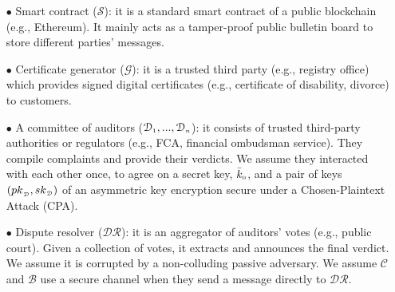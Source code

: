 \begin{itemize}[leftmargin=3.8mm]
%
\item[$\bullet$] Smart contract ($\mathcal{S}$): it is a standard smart contract of a public blockchain (e.g., Ethereum). It mainly acts as a tamper-proof public bulletin board to store different parties' messages.  %
%
\item[$\bullet$] Certificate generator ($\mathcal{G}$): it is a trusted third party (e.g., registry office) which provides signed digital certificates (e.g., certificate of disability, divorce) to customers. %
%
\item[$\bullet$]  A committee of auditors ($\mathcal{D}_{\scriptscriptstyle 1},..., \mathcal{D}_{\scriptscriptstyle n}$): it consists of trusted third-party authorities or regulators (e.g.,  FCA, financial ombudsman service). They compile complaints and provide their verdicts.
%
 We assume they   interacted with each  other once,  to agree on a secret key, $\bar k_{\scriptscriptstyle 0}$, and a pair of keys $({pk}_{\scriptscriptstyle\mathcal {D}}, {sk}_{\scriptscriptstyle\mathcal {D}})$  of an asymmetric key encryption secure under a Chosen-Plaintext Attack (CPA).
%
\item[$\bullet$]  Dispute resolver ($\mathcal{DR}$): it is an aggregator of auditors' votes (e.g., public court). Given a collection of votes, it extracts and announces the final verdict. We assume it is corrupted by a non-colluding passive adversary. We assume $\mathcal C$ and $\mathcal B$  use a secure channel when they send a message directly to $\mathcal{DR}$. 
%
\end{itemize}







